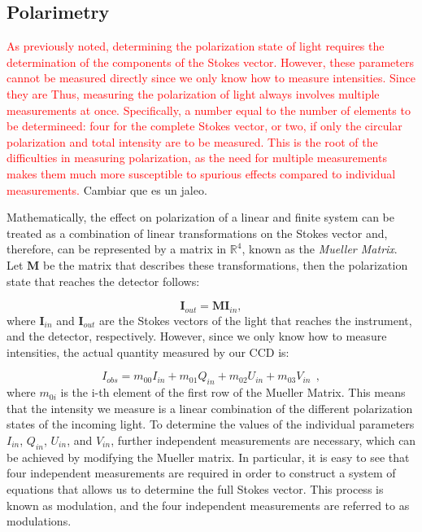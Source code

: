 \subsection{Polarimetry}

\textcolor{red}{As previously noted, determining the polarization state of light requires the determination of the components of the Stokes vector. However, these parameters cannot be measured directly since we only know how to measure intensities. Since they are  Thus, measuring the polarization of light always involves multiple measurements at once. Specifically, a number equal to the number of elements to be determineed: four for the complete Stokes vector, or two, if only the circular polarization and total intensity are to be measured. This is the root of the difficulties in measuring polarization, as the need for multiple measurements makes them much more susceptible to spurious effects compared to individual measurements.} Cambiar que es un jaleo. 

Mathematically, the effect on polarization of a linear and finite system can be treated as a combination of linear transformations on the Stokes vector and, therefore, can be represented by a matrix in $\mathbb{R}^4$, known as the \textit{Mueller Matrix}. Let $\textbf{M}$ be the matrix that describes these transformations, then the polarization state that reaches the detector follows:

\begin{equation}
  \textbf{I}_{out} = \textbf{M}\textbf{I}_{in},
\end{equation}
where $\textbf{I}_{in}$ and $\textbf{I}_{out}$ are the Stokes vectors of the light that reaches the instrument, and the detector, respectively. However, since we only know how to measure intensities, the actual quantity measured by our CCD is: 

\begin{equation}
  I_{obs} = m_{00}I_{in} + m_{01}Q_{in} + m_{02}U_{in} + m_{03}V_{in} \ \ ,
\end{equation}
where $m_{0i}$ is the i-th element of the first row of the Mueller Matrix. This means that the intensity we measure is a linear combination of the different polarization states of the incoming light. To determine the values of the individual parameters $I_{in}$, $Q_{in}$, $U_{in}$, and $V_{in}$, further independent measurements are necessary, which can be achieved by modifying the Mueller matrix. In particular, it is easy to see that four independent measurements are required in order to construct a system of equations that allows us to determine the full Stokes vector. This process is known as modulation, and the four independent measurements are referred to as modulations.

